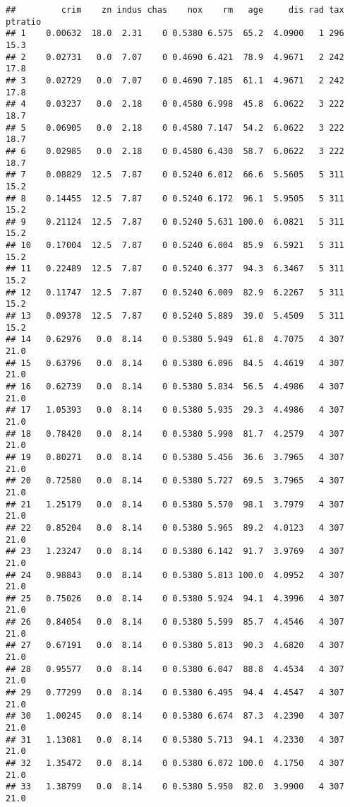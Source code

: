 \documentclass[]{article}
\begin{document}
\begin{verbatim}
##         crim    zn indus chas    nox    rm   age     dis rad tax ptratio
## 1    0.00632  18.0  2.31    0 0.5380 6.575  65.2  4.0900   1 296    15.3
## 2    0.02731   0.0  7.07    0 0.4690 6.421  78.9  4.9671   2 242    17.8
## 3    0.02729   0.0  7.07    0 0.4690 7.185  61.1  4.9671   2 242    17.8
## 4    0.03237   0.0  2.18    0 0.4580 6.998  45.8  6.0622   3 222    18.7
## 5    0.06905   0.0  2.18    0 0.4580 7.147  54.2  6.0622   3 222    18.7
## 6    0.02985   0.0  2.18    0 0.4580 6.430  58.7  6.0622   3 222    18.7
## 7    0.08829  12.5  7.87    0 0.5240 6.012  66.6  5.5605   5 311    15.2
## 8    0.14455  12.5  7.87    0 0.5240 6.172  96.1  5.9505   5 311    15.2
## 9    0.21124  12.5  7.87    0 0.5240 5.631 100.0  6.0821   5 311    15.2
## 10   0.17004  12.5  7.87    0 0.5240 6.004  85.9  6.5921   5 311    15.2
## 11   0.22489  12.5  7.87    0 0.5240 6.377  94.3  6.3467   5 311    15.2
## 12   0.11747  12.5  7.87    0 0.5240 6.009  82.9  6.2267   5 311    15.2
## 13   0.09378  12.5  7.87    0 0.5240 5.889  39.0  5.4509   5 311    15.2
## 14   0.62976   0.0  8.14    0 0.5380 5.949  61.8  4.7075   4 307    21.0
## 15   0.63796   0.0  8.14    0 0.5380 6.096  84.5  4.4619   4 307    21.0
## 16   0.62739   0.0  8.14    0 0.5380 5.834  56.5  4.4986   4 307    21.0
## 17   1.05393   0.0  8.14    0 0.5380 5.935  29.3  4.4986   4 307    21.0
## 18   0.78420   0.0  8.14    0 0.5380 5.990  81.7  4.2579   4 307    21.0
## 19   0.80271   0.0  8.14    0 0.5380 5.456  36.6  3.7965   4 307    21.0
## 20   0.72580   0.0  8.14    0 0.5380 5.727  69.5  3.7965   4 307    21.0
## 21   1.25179   0.0  8.14    0 0.5380 5.570  98.1  3.7979   4 307    21.0
## 22   0.85204   0.0  8.14    0 0.5380 5.965  89.2  4.0123   4 307    21.0
## 23   1.23247   0.0  8.14    0 0.5380 6.142  91.7  3.9769   4 307    21.0
## 24   0.98843   0.0  8.14    0 0.5380 5.813 100.0  4.0952   4 307    21.0
## 25   0.75026   0.0  8.14    0 0.5380 5.924  94.1  4.3996   4 307    21.0
## 26   0.84054   0.0  8.14    0 0.5380 5.599  85.7  4.4546   4 307    21.0
## 27   0.67191   0.0  8.14    0 0.5380 5.813  90.3  4.6820   4 307    21.0
## 28   0.95577   0.0  8.14    0 0.5380 6.047  88.8  4.4534   4 307    21.0
## 29   0.77299   0.0  8.14    0 0.5380 6.495  94.4  4.4547   4 307    21.0
## 30   1.00245   0.0  8.14    0 0.5380 6.674  87.3  4.2390   4 307    21.0
## 31   1.13081   0.0  8.14    0 0.5380 5.713  94.1  4.2330   4 307    21.0
## 32   1.35472   0.0  8.14    0 0.5380 6.072 100.0  4.1750   4 307    21.0
## 33   1.38799   0.0  8.14    0 0.5380 5.950  82.0  3.9900   4 307    21.0

\end{verbatim}
\end{document}
